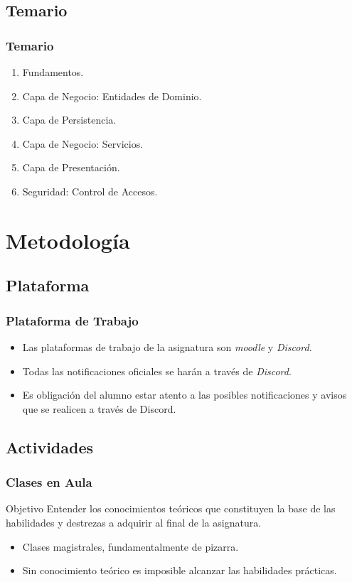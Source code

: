 \documentclass[a4paper,t,xcolor=pst,dvips,colortheme]{beamer}
\begin{document}
\subsection{Temario}

\begin{frame}[c]
	\frametitle{Temario}
	\begin{enumerate}
		\item<1-> Fundamentos.
		\item<2-> Capa de Negocio: Entidades de Dominio.
		\item<3-> Capa de Persistencia.
		\item<4-> Capa de Negocio: Servicios.
		\item<5-> Capa de Presentación.
        \item<6-> Seguridad: Control de Accesos.
	\end{enumerate}
\end{frame}

\section{Metodología}

\subsection{Plataforma}

\begin{frame}[c]
	\frametitle{Plataforma de Trabajo}
	\begin{itemize}
		\item<1-> Las plataformas de trabajo de la asignatura son \emph{moodle} y \emph{Discord}.
		\item<2-> Todas las notificaciones oficiales se harán a través de \emph{Discord}.
		\item<3-> \alert{Es obligación del alumno estar atento a las posibles notificaciones y avisos que se realicen a través de Discord}.
	\end{itemize}
\end{frame}

\subsection{Actividades}

\begin{frame}
	\frametitle{Clases en Aula}
	\begin{block}{Objetivo}
        Entender los conocimientos teóricos que constituyen la base de las habilidades y destrezas a adquirir al final de la asignatura.
	\end{block}
    \begin{itemize}
        \item<2-> Clases magistrales, fundamentalmente de pizarra.
		\item<3-> Sin conocimiento teórico es imposible alcanzar las habilidades prácticas.
	\end{itemize}
\end{frame}
\end{document}
